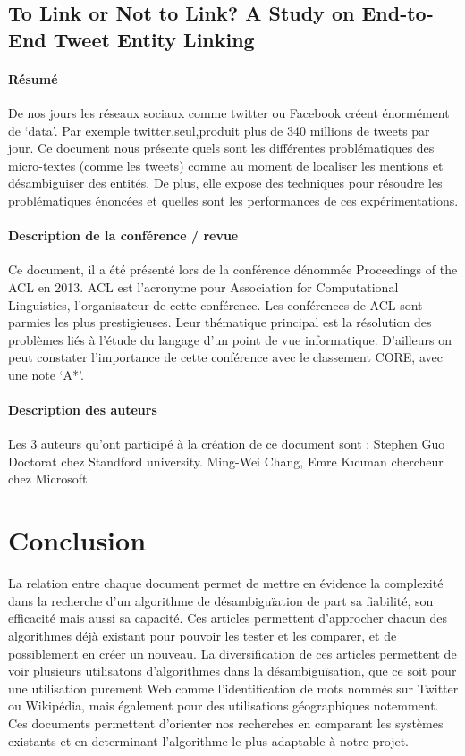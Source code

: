 \documentclass{article}
\begin{document}
\subsection{To Link or Not to Link? A Study on End-to-End Tweet Entity Linking \cite{article-15}}

\paragraph{Résumé}
De nos jours les réseaux sociaux comme twitter ou Facebook créent énormément de ‘data’. Par exemple twitter,seul,produit plus de 340 millions de tweets par jour. Ce document nous présente quels sont les différentes problématiques des micro-textes (comme les tweets)  comme au moment de localiser les mentions et désambiguiser des entités. De plus, elle expose des techniques pour résoudre les problématiques énoncées et quelles sont les performances de ces expérimentations.


\paragraph{Description de la conférence / revue}
Ce document, il a été présenté lors de la conférence dénommée Proceedings of the ACL en 2013. ACL est l’acronyme pour Association for Computational Linguistics, l’organisateur de cette conférence.
Les conférences de ACL sont parmies les plus prestigieuses. Leur thématique principal est la résolution des problèmes liés à l’étude du langage d’un point de vue informatique. 
D’ailleurs on peut constater l’importance de cette conférence avec le classement CORE, avec une note ‘A*’.


\paragraph{Description des auteurs}
Les 3 auteurs qu’ont participé à la création de ce document sont :
Stephen Guo Doctorat chez Standford university.
Ming-Wei Chang, Emre Kıcıman chercheur chez Microsoft. 



\section{Conclusion}

La relation entre chaque document permet de mettre en évidence la complexité dans la recherche d'un algorithme de désambiguïation de part sa fiabilité, son efficacité mais aussi sa capacité. Ces articles permettent d'approcher chacun des algorithmes déjà existant pour pouvoir les tester et les comparer, et de possiblement en créer un nouveau. La diversification de ces articles permettent de voir plusieurs utilisatons d'algorithmes dans la désambiguïsation, que ce soit pour une utilisation purement Web comme l'identification de mots nommés sur Twitter ou Wikipédia, mais également pour des utilisations géographiques notemment. Ces documents permettent d'orienter nos recherches en comparant les systèmes existants et en determinant l'algorithme le plus adaptable à notre projet.






\end{document}
